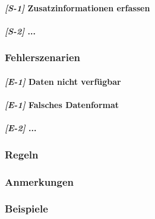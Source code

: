 \paragraph{\textit{\textbf{[S-1]}} Zusatzinformationen erfassen}
\paragraph{\textit{\textbf{[S-2]}} ...}

\subsubsection{Fehlerszenarien}

\paragraph{\textit{\textbf{[E-1]}} Daten nicht verfügbar}
\paragraph{\textit{\textbf{[E-1]}} Falsches Datenformat}
\paragraph{\textit{\textbf{[E-2]}} ...}

\subsubsection{Regeln}

\subsubsection{Anmerkungen}

\subsubsection{Beispiele}
